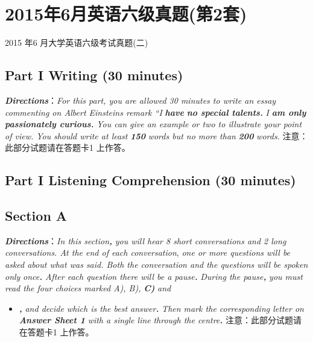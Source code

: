 \documentclass[UTF8,11pt]{ctexart}
\begin{document}
\section*{2015年6月英语六级真题(第2套)}
2015 年6 月大学英语六级考试真题(二)


\subsection*{\textbf{Part I} \textbf{Writing} \textbf{(30 minutes)}}


\textbf{\textit{Directions}}：\textit{For this part, you are allowed 30 minutes to write an essay commenting on Albert Einsteins remark “I}\textbf{\textit{ have}} \textbf{\textit{no special talents.}}\textit{ I}\textbf{\textit{ am only passionately curious.}}\textit{ You can give an example or two to illustrate your point of view. You} \textit{should write at least}\textbf{\textit{ 150}}\textit{ words but no more than}\textbf{\textit{ 200}}\textit{ words.} 注意：此部分试题请在答题卡1 上作答。


\subsection*{\textbf{Part I} \textbf{Listening Comprehension} \textbf{(30 minutes)}}


\subsection*{\textbf{Section A}}


\textbf{\textit{Directions}}：\textit{In this section}\textbf{\textit{,}}\textit{ you will hear 8 short conversations and 2 long conversations. At the end of each conversation}, \textit{one or more questions will be asked about what was said. Both the conversation and the questions will be spoken only} \textit{once}\textbf{\textit{.}}\textit{ After each question there will be a pause}\textbf{\textit{.}}\textit{ During the pause}\textbf{\textit{,}}\textit{ you must read the four choices marked A), B),}\textbf{\textit{ C)}}\textit{ and}


\begin{itemize}[leftmargin=2em,itemsep=.2em,topsep=.4em]\item[D.] \textbf{\textit{,}}\textit{ and decide which is the best answer}\textbf{\textit{.}}\textit{ Then mark the corresponding letter on}\textbf{\textit{ Answer Sheet 1}}\textit{ with a single line} \textit{through the centre}\textbf{\textit{.}} 注意：此部分试题请在答题卡1 上作答。
\end{itemize}
\end{document}
